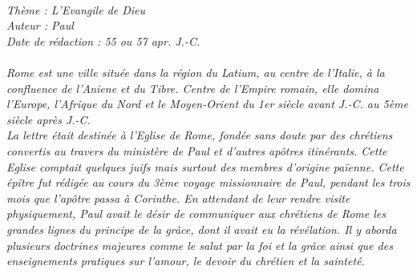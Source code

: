 \BFont
\noindent\hrulefill
\textit{
\bigskip
{\centering{}
\\Thème : L'Evangile de Dieu
\\Auteur : Paul
\\Date de rédaction : 55 ou 57 apr. J.-C.\\}
}
\textit{
\\Rome est une ville située dans la région du Latium, au centre de l’Italie, à la confluence de l’Aniene et du Tibre. Centre de l’Empire romain,  elle domina  l’Europe, l’Afrique du Nord et le Moyen-Orient du 1er siècle avant J.-C. au 5ème siècle après J.-C.
\bigskip
\\La lettre était destinée à l’Eglise de Rome, fondée sans doute par des chrétiens convertis au  travers du ministère de Paul et d’autres apôtres itinérants. Cette Eglise comptait quelques juifs mais surtout des membres d’origine païenne. Cette épître fut rédigée au cours du 3ème voyage missionnaire de Paul,  pendant les trois mois que l’apôtre passa à Corinthe. En attendant de leur rendre visite physiquement, Paul avait le désir de communiquer aux chrétiens de Rome les grandes lignes du principe de la grâce, dont il avait eu la révélation. Il y aborda plusieurs doctrines majeures comme le salut par la foi et la grâce ainsi que des enseignements pratiques sur l’amour, le devoir du chrétien et la sainteté.\bigskip
}
\par\nobreak\noindent\hrulefill

